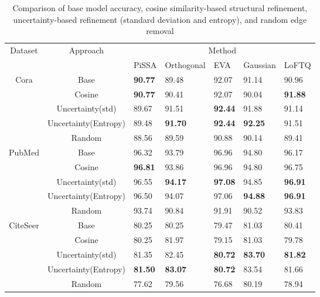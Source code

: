 \documentclass{article}
\begin{document}
\begin{table}[ht]
\centering
\caption{
Comparison of base model accuracy, cosine similarity-based structural refinement,
uncertainty-based refinement (standard deviation and entropy),
and random edge removal
}
\label{tab:compare_structural_enhancer_random_model}
\begin{tabularx}{\linewidth}{c c || *{5}{X}}
\hline
\multirow{2}{*}{Dataset} &
\multirow{2}{*}{Approach} &
\multicolumn{5}{c}{Method} \\
\cline{3-7}
 &  & PiSSA & Orthogonal & EVA & Gaussian & LoFTQ \\
\hline

\multirow{5}{*}{Cora}
 & Base
 & \textbf{90.77} & 89.48 & 92.07 & 91.14 & 90.96 \\
\cline{2-7}
 & Cosine
 & \textbf{90.77} & 90.41 & 92.07 & 90.04 & \textbf{91.88} \\
\cline{2-7}
 & Uncertainty(std)
 & 89.67 & 91.51 & \textbf{92.44} & 91.88 & 91.14 \\
\cline{2-7}
 & Uncertainty(Entropy)
 & 89.48 & \textbf{91.70} & \textbf{92.44} & \textbf{92.25} & 91.51 \\
\cline{2-7}
 & Random
 & 88.56 & 89.59 & 90.88 & 90.14 & 89.41 \\
\hline
\hline

\multirow{5}{*}{PubMed}
 & Base
 & 96.32 & 93.79 & 96.96 & 94.80 & 96.17 \\
\cline{2-7}
 & Cosine
 & \textbf{96.81} & 93.86 & 96.96 & 94.80 & 96.75 \\
\cline{2-7}
 & Uncertainty(std)
 & 96.55 & \textbf{94.17} & \textbf{97.08} & 94.85 & \textbf{96.91} \\
\cline{2-7}
 & Uncertainty(Entropy)
 & 96.50 & 94.07 & 97.06 & \textbf{94.88} & \textbf{96.91} \\
\cline{2-7}
 & Random
 & 93.74 & 90.84 & 91.91 & 90.52 & 93.83 \\
\hline
\hline

\multirow{5}{*}{CiteSeer}
 & Base
 & 80.25 & 80.25 & 79.47 & 81.03 & 80.41 \\
\cline{2-7}
 & Cosine
 & 80.25 & 81.97 & 79.15 & 81.03 & 79.78 \\
\cline{2-7}
 & Uncertainty(std)
 & 81.35 & 82.45 & \textbf{80.72} & \textbf{83.70} & \textbf{81.82} \\
\cline{2-7}
 & Uncertainty(Entropy)
 & \textbf{81.50} & \textbf{83.07} & \textbf{80.72} & 83.54 & 81.66 \\
\cline{2-7}
 & Random
 & 77.62 & 79.56 & 76.68 & 80.19 & 78.94 \\
\hline
\hline


\end{tabularx}
\end{table}
\end{document}
